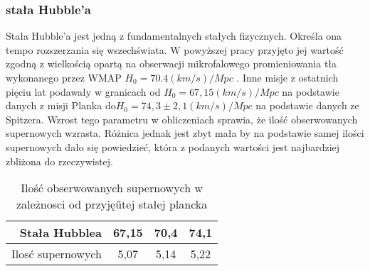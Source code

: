 \documentclass[polish,12pt]{pracamgr}
\begin{document}
\subsubsection{stała Hubble'a}
Stała Hubble’a jest jedną z fundamentalnych stałych fizycznych. Określa ona tempo rozszerzania się wszechświata. W powyższej pracy przyjęto jej wartość zgodną z wielkością opartą na obserwacji mikrofalowego promieniowania tła wykonanego przez WMAP 
$ H_0 = 70.4 (km/s)/Mpc $ . Inne misje z ostatnich pięciu lat podawały w granicach od $H_0 = 67,15(km/s)/Mpc$ na podstawie danych z misji Planka do$ H_0 = 74,3 \pm 2,1(km/s)/Mpc $ na podstawie danych ze Spitzera. Wzrost tego parametru w obliczeniach sprawia, że ilość obserwowanych supernowych wzrasta. Różnica jednak jest zbyt mała  by na podstawie samej ilości supernowych dało się powiedzieć, która z podanych wartości jest najbardziej zbliżona do rzeczywistej. 
	\begin{table}
	\caption{Ilość obserwowanych supernowych w zależnosci od przyjęűtej stałej plancka}
	\label{nazwa odnosnika, ktora potem uzyjemy do cytowania tabeli}
	\begin{tabular}{ r|c|c|c }
  	Stała Hubblea &  67,15 & 70,4 &74,1\\ 
  	\hline
  	Ilosć supernowych & 5,07 & 5,14 & 5,22\\
	\end{tabular}
	\end{table}


\end{document}
